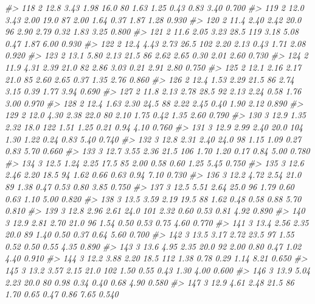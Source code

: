 \documentclass[]{book}
\newenvironment{Shaded}{\begin{snugshade}}{\end{snugshade}}
\newcommand{\CommentTok}[1]{\textcolor[rgb]{0.56,0.35,0.01}{\textit{#1}}}
\begin{document}
\begin{Shaded}
\begin{Highlighting}[]
\CommentTok{#> 118  2   12.8  3.43  1.98  16.0   80 1.63  1.25 0.43  0.83  3.40 0.700}
\CommentTok{#> 119  2   12.0  3.43  2.00  19.0   87 2.00  1.64 0.37  1.87  1.28 0.930}
\CommentTok{#> 120  2   11.4  2.40  2.42  20.0   96 2.90  2.79 0.32  1.83  3.25 0.800}
\CommentTok{#> 121  2   11.6  2.05  3.23  28.5  119 3.18  5.08 0.47  1.87  6.00 0.930}
\CommentTok{#> 122  2   12.4  4.43  2.73  26.5  102 2.20  2.13 0.43  1.71  2.08 0.920}
\CommentTok{#> 123  2   13.1  5.80  2.13  21.5   86 2.62  2.65 0.30  2.01  2.60 0.730}
\CommentTok{#> 124  2   11.9  4.31  2.39  21.0   82 2.86  3.03 0.21  2.91  2.80 0.750}
\CommentTok{#> 125  2   12.1  2.16  2.17  21.0   85 2.60  2.65 0.37  1.35  2.76 0.860}
\CommentTok{#> 126  2   12.4  1.53  2.29  21.5   86 2.74  3.15 0.39  1.77  3.94 0.690}
\CommentTok{#> 127  2   11.8  2.13  2.78  28.5   92 2.13  2.24 0.58  1.76  3.00 0.970}
\CommentTok{#> 128  2   12.4  1.63  2.30  24.5   88 2.22  2.45 0.40  1.90  2.12 0.890}
\CommentTok{#> 129  2   12.0  4.30  2.38  22.0   80 2.10  1.75 0.42  1.35  2.60 0.790}
\CommentTok{#> 130  3   12.9  1.35  2.32  18.0  122 1.51  1.25 0.21  0.94  4.10 0.760}
\CommentTok{#> 131  3   12.9  2.99  2.40  20.0  104 1.30  1.22 0.24  0.83  5.40 0.740}
\CommentTok{#> 132  3   12.8  2.31  2.40  24.0   98 1.15  1.09 0.27  0.83  5.70 0.660}
\CommentTok{#> 133  3   12.7  3.55  2.36  21.5  106 1.70  1.20 0.17  0.84  5.00 0.780}
\CommentTok{#> 134  3   12.5  1.24  2.25  17.5   85 2.00  0.58 0.60  1.25  5.45 0.750}
\CommentTok{#> 135  3   12.6  2.46  2.20  18.5   94 1.62  0.66 0.63  0.94  7.10 0.730}
\CommentTok{#> 136  3   12.2  4.72  2.54  21.0   89 1.38  0.47 0.53  0.80  3.85 0.750}
\CommentTok{#> 137  3   12.5  5.51  2.64  25.0   96 1.79  0.60 0.63  1.10  5.00 0.820}
\CommentTok{#> 138  3   13.5  3.59  2.19  19.5   88 1.62  0.48 0.58  0.88  5.70 0.810}
\CommentTok{#> 139  3   12.8  2.96  2.61  24.0  101 2.32  0.60 0.53  0.81  4.92 0.890}
\CommentTok{#> 140  3   12.9  2.81  2.70  21.0   96 1.54  0.50 0.53  0.75  4.60 0.770}
\CommentTok{#> 141  3   13.4  2.56  2.35  20.0   89 1.40  0.50 0.37  0.64  5.60 0.700}
\CommentTok{#> 142  3   13.5  3.17  2.72  23.5   97 1.55  0.52 0.50  0.55  4.35 0.890}
\CommentTok{#> 143  3   13.6  4.95  2.35  20.0   92 2.00  0.80 0.47  1.02  4.40 0.910}
\CommentTok{#> 144  3   12.2  3.88  2.20  18.5  112 1.38  0.78 0.29  1.14  8.21 0.650}
\CommentTok{#> 145  3   13.2  3.57  2.15  21.0  102 1.50  0.55 0.43  1.30  4.00 0.600}
\CommentTok{#> 146  3   13.9  5.04  2.23  20.0   80 0.98  0.34 0.40  0.68  4.90 0.580}
\CommentTok{#> 147  3   12.9  4.61  2.48  21.5   86 1.70  0.65 0.47  0.86  7.65 0.540}

\end{Highlighting}
\end{Shaded}
\end{document}
